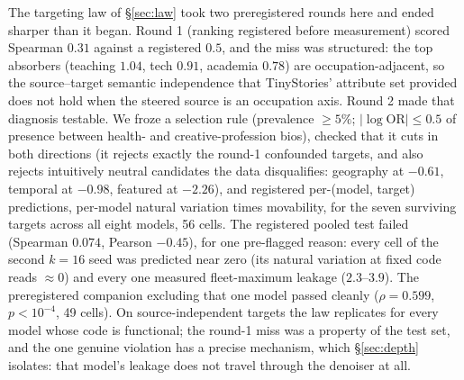 \documentclass[11pt]{article}
\begin{document}
The targeting law of \S\ref{sec:law} took two preregistered rounds here and
ended sharper than it began. Round 1 (ranking registered before measurement)
scored Spearman $0.31$ against a registered $0.5$, and the miss was
structured: the top absorbers (teaching $1.04$, tech $0.91$, academia $0.78$)
are occupation-adjacent, so the source--target semantic independence that
TinyStories' attribute set provided does not hold when the steered source is
an occupation axis. Round 2 made that diagnosis testable. We froze a
selection rule (prevalence $\geq 5\%$; $|\log\mathrm{OR}| \leq 0.5$ of
presence between health- and creative-profession bios), checked that it cuts
in both directions (it rejects exactly the round-1 confounded targets, and
also rejects intuitively neutral candidates the data disqualifies: geography
at $-0.61$, temporal at $-0.98$, featured at $-2.26$), and registered
per-(model, target) predictions, per-model natural variation times
movability, for the seven surviving targets across all eight models, 56
cells. The registered pooled test failed (Spearman $0.074$, Pearson
$-0.45$), for one pre-flagged reason: every cell of the second $k{=}16$ seed
was predicted near zero (its natural variation at fixed code reads
${\approx}0$) and every one measured fleet-maximum leakage ($2.3$--$3.9$).
The preregistered companion excluding that one model passed cleanly
($\rho{=}0.599$, $p{<}10^{-4}$, 49 cells). On source-independent targets the
law replicates for every model whose code is functional; the round-1 miss
was a property of the test set, and the one genuine violation has a precise
mechanism, which \S\ref{sec:depth} isolates: that model's leakage does not
travel through the denoiser at all.
\end{document}
